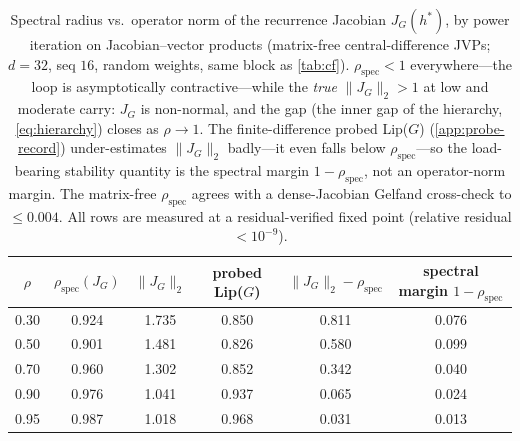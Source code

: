 \documentclass[11pt]{article}
\begin{document}
\begin{table}[ht]
\centering
\begin{tabular}{@{}cccccc@{}}
\toprule
$\rho$ & $\rho_{\text{spec}}(J_G)$ & $\|J_G\|_2$ & probed Lip($G$) & $\|J_G\|_2 - \rho_{\text{spec}}$ & spectral margin $1-\rho_{\text{spec}}$ \\
\midrule
0.30 & 0.924 & 1.735 & 0.850 & 0.811 & 0.076 \\
0.50 & 0.901 & 1.481 & 0.826 & 0.580 & 0.099 \\
0.70 & 0.960 & 1.302 & 0.852 & 0.342 & 0.040 \\
0.90 & 0.976 & 1.041 & 0.937 & 0.065 & 0.024 \\
0.95 & 0.987 & 1.018 & 0.968 & 0.031 & 0.013 \\
\bottomrule
\end{tabular}
\caption{Spectral radius vs.\ operator norm of the recurrence Jacobian $J_G(h^*)$, by power iteration on Jacobian--vector products (matrix-free central-difference JVPs; $d=32$, seq $16$, random weights, same block as \cref{tab:cf}). $\rho_{\text{spec}} < 1$ everywhere---the loop is asymptotically contractive---while the \emph{true} $\|J_G\|_2 > 1$ at low and moderate carry: $J_G$ is non-normal, and the gap (the inner gap of the hierarchy, \cref{eq:hierarchy}) closes as $\rho \to 1$. The finite-difference probed Lip($G$) (\cref{app:probe-record}) under-estimates $\|J_G\|_2$ badly---it even falls below $\rho_{\text{spec}}$---so the load-bearing stability quantity is the spectral margin $1-\rho_{\text{spec}}$, not an operator-norm margin. The matrix-free $\rho_{\text{spec}}$ agrees with a dense-Jacobian Gelfand cross-check to $\le 0.004$. All rows are measured at a residual-verified fixed point (relative residual $< 10^{-9}$).}
\label{tab:spectral}
\end{table}
\end{document}
